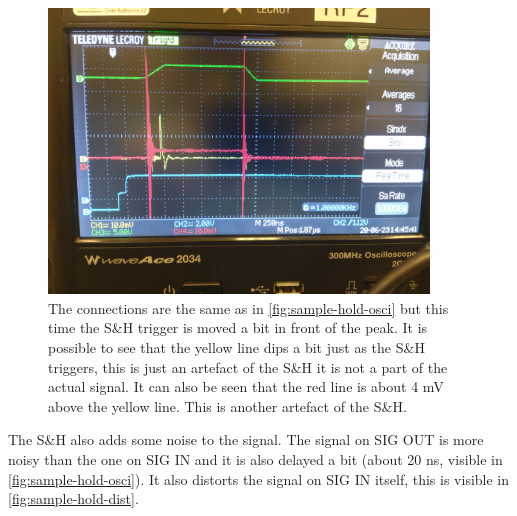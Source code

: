 \documentclass[a4paper, 10pt]{article}
\begin{document}
\begin{figure}[H]
    \centering
    \includegraphics[width=0.9\textwidth]{../images/sample-hold-osci-2.jpg}
    \caption{The connections are the same as in \cref{fig:sample-hold-osci} but this time the S\&H trigger is moved a bit in front of the peak. It is possible to see that the yellow line dips a bit just as the S\&H triggers, this is just an artefact of the S\&H it is not a part of the actual signal. It can also be seen that the red line is about 4 \si{\milli\volt} above the yellow line. This is another artefact of the S\&H.}
    \label{fig:sample-hold-osci-2}
\end{figure}

The S\&H also adds some noise to the signal.
The signal on SIG OUT is more noisy than the one on SIG IN and it is also delayed a bit (about 20 \si{\nano\second}, visible in \cref{fig:sample-hold-osci}).
It also distorts the signal on SIG IN itself, this is visible in \cref{fig:sample-hold-dist}.
\end{document}
